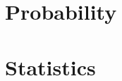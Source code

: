 \documentclass[11pt,a4paper,openright]{book}
\begin{document}
\maketitle


%




\tableofcontents

\mainmatter


\chapter{Probability}















\chapter{Statistics}

%
\backmatter

\printbibliography
\end{document}
